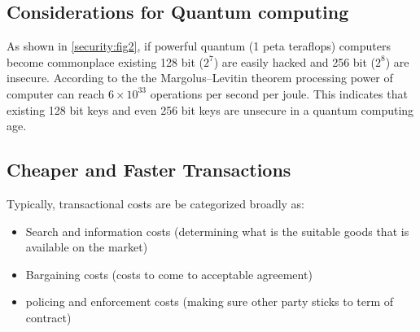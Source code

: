 \documentclass[12pt]{scrreprt}
\begin{document}
 	
 \subsection{Considerations for Quantum computing}
 As shown in \ref*{security:fig2}, if powerful quantum (1 peta teraflops) computers become commonplace existing 128 bit ($2^7$) are easily hacked and 256 bit ($2^8$) are insecure. According to the the Margolus–Levitin theorem processing power of computer can reach $6 \times 10^{33}$ operations per second per joule. This indicates that existing 128 bit keys and even 256 bit keys are unsecure in a quantum computing age. 
 
 
 
 \subsection{Cheaper and Faster Transactions}
 Typically, transactional costs are be categorized broadly as: \cite{RePEc:ucp:jlawec:v:22:y:1979:i:1:p:141-62}
 \begin{itemize}
 \item Search and information costs (determining what is the suitable goods that is available on the market)
 \item Bargaining costs (costs to come to acceptable agreement)
 \item policing and enforcement costs (making sure other party sticks to term of contract)
 \end{itemize} 
 
\end{document}
